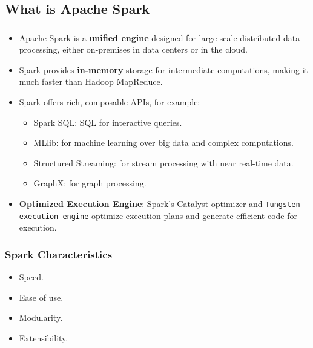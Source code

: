 \subsection{What is Apache Spark}\label{subsec:what-is-apache-spark}
\begin{frame}
    \frametitle{\subsecname}
    \begin{itemize}
        \item Apache Spark is a \textbf{unified engine} designed for large-scale distributed data processing, either on-premises in data centers or in the cloud.\pause
        \item Spark provides \textbf{in-memory} storage for intermediate computations, making it much faster than Hadoop MapReduce.\pause
        \item Spark offers rich, composable APIs, for example:
        \begin{itemize}
            \item Spark SQL: SQL for interactive queries.
            \item MLlib: for machine learning over big data and complex computations.
            \item Structured Streaming: for stream processing with near real-time data.
            \item GraphX: for graph processing.
        \end{itemize}
        \item \textbf{Optimized Execution Engine}: Spark's Catalyst optimizer and \texttt{Tungsten execution engine} optimize execution plans and generate efficient code for execution.
    \end{itemize}
\end{frame}

\begin{frame}
    \frametitle{Spark Characteristics}
    \begin{itemize}
        \item Speed. \pause
        \item Ease of use. \pause
        \item Modularity. \pause
        \item Extensibility. \pause
    \end{itemize}
\end{frame}


